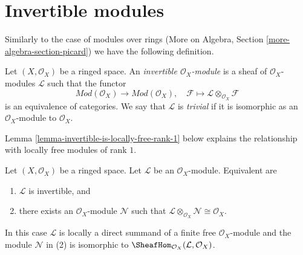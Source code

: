 \section{Invertible modules}
\label{section-invertible}

\noindent
Similarly to the case of modules over rings
(More on Algebra, Section \ref{more-algebra-section-picard})
we have the following definition.

\begin{definition}
\label{definition-invertible}
Let $(X, \mathcal{O}_X)$ be a ringed space. An
{\it invertible $\mathcal{O}_X$-module} is a sheaf
of $\mathcal{O}_X$-modules $\mathcal{L}$ such that
the functor
$$
\textit{Mod}(\mathcal{O}_X) \longrightarrow \textit{Mod}(\mathcal{O}_X),\quad
\mathcal{F} \longmapsto \mathcal{L} \otimes_{\mathcal{O}_X} \mathcal{F}
$$
is an equivalence of categories. We say that $\mathcal{L}$ is
{\it trivial} if it is isomorphic as an $\mathcal{O}_X$-module
to $\mathcal{O}_X$.
\end{definition}

\noindent
Lemma \ref{lemma-invertible-is-locally-free-rank-1}
below explains the relationship with locally free modules
of rank $1$.

\begin{lemma}
\label{lemma-invertible}
Let $(X, \mathcal{O}_X)$ be a ringed space. Let $\mathcal{L}$
be an $\mathcal{O}_X$-module. Equivalent are
\begin{enumerate}
\item $\mathcal{L}$ is invertible, and
\item there exists an $\mathcal{O}_X$-module $\mathcal{N}$
such that
$\mathcal{L} \otimes_{\mathcal{O}_X} \mathcal{N} \cong \mathcal{O}_X$.
\end{enumerate}
In this case $\mathcal{L}$ is locally a direct summand of a finite free
$\mathcal{O}_X$-module and the module $\mathcal{N}$ in (2) is isomorphic to
$\SheafHom_{\mathcal{O}_X}(\mathcal{L}, \mathcal{O}_X)$.
\end{lemma}

